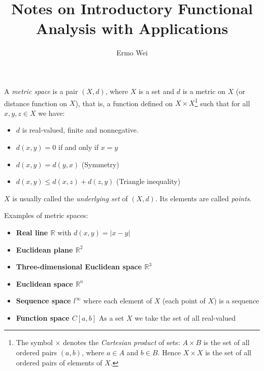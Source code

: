 \documentclass[9pt]{article}
\begin{document}
\title{Notes on Introductory Functional Analysis with Applications}
\author{Ermo Wei}
\date{}

\maketitle

\tableofcontents
\hypersetup{colorlinks=blue}

\clearpage 

 A \textit{metric space} is a pair \( (X,d)\), where \(X\) is a set and \(d\) is a metric on \(X\) (or distance function on \(X\)), that is, a function defined on \(X \times X\)\footnote{The symbol \(\times\) denotes the \textit{Cartesian product} of sets: \(A\times B\) is the set of all ordered pairs \( (a,b)\), where \(a \in A\) and \(b \in B\). Hence \(X\times X\) is the set of all ordered pairs of elements of \(X\).} such that for all \(x,y,z \in X\) we have:
\begin{itemize}
\item \(d\) is real-valued, finite and nonnegative.
\item \(d(x,y) = 0\) if and only if  \(x=y\)
\item \(d(x,y)=d(y,x)\) \qquad (Symmetry)
\item \(d(x,y) \le d(x,z) + d(z,y)\) \qquad (Triangle inequality)
\end{itemize}

\(X\) is usually called the \textit{underlying set} of \((X,d)\). Its elements are called \textit{points}.

Examples of metric spaces:
\begin{itemize}
\item \textbf{Real line \(\mathbb{R}\)} with \(d(x,y) = |x-y|\)
\item \textbf{Euclidean plane \(\mathbb{R}^2\)} 
\item \textbf{Three-dimensional Euclidean space \(\mathbb{R}^3\)} 
\item \textbf{Euclidean space \(\mathbb{R}^n\)} 
\item \textbf{Sequence space \(l^\infty\)} where each element of \(X\) (each point of \(X\)) is a sequence
\item \textbf{Function space \(C[a,b]\)} As a set \(X\) we take the set of all real-valued
\end{itemize}
\end{document}
